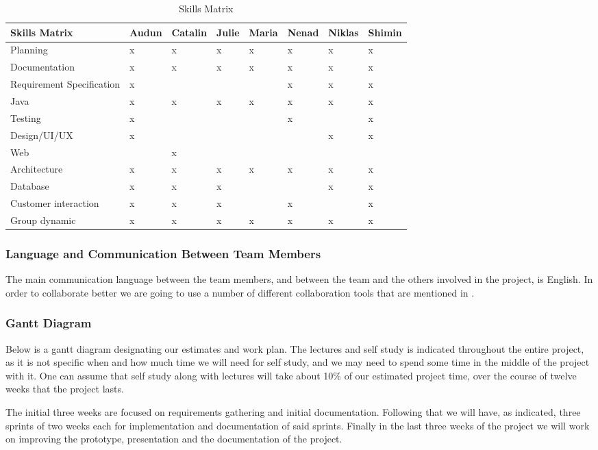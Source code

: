 \documentclass[../document.tex]{subfiles}
\begin{document}
\begin{table}[H]
\caption{Skills Matrix}
\begin{tabularx}{\textwidth}{|L{2.2cm}|X|X|L{.7cm}|X|X|X|X|}
\hline
Skills Matrix
&Audun
&Catalin
&Julie
&Maria
&Nenad
&Niklas
&Shimin
\\ \hline Planning
&x
&x
&x
&x
&x
&x
&x
\\ \hline Documentation
&x
&x
&x
&x
&x
&x
&x
\\ \hline Requirement Specification
&x
&
&
&
&x
&x
&x
\\ \hline Java
&x
&x
&x
&x
&x
&x
&x
\\ \hline Testing
&x
&
&
&
&x
&
&x
\\ \hline Design/UI/UX
&x
&
&
&
&
&x
&x
\\ \hline Web
&
&x
&
&
&
&
&
\\ \hline Architecture
&x
&x
&x
&x
&x
&x
&x
\\ \hline Database
&x
&x
&x
&
&
&x
&x
\\ \hline Customer interaction
&x
&x
&x
&
&x
&
&x
\\ \hline Group dynamic
&x
&x
&x
&x
&x
&x
&x
\\ \hline
\end{tabularx}
\end{table}

\subsubsection{Language and Communication Between Team Members}
The main communication language between the team members, and between the team and the others involved in the project, is English. In order to collaborate better we are going to use a number of different collaboration tools that are mentioned in .


\subsubsection{Gantt Diagram}
Below is a gantt diagram designating our estimates and work plan. The lectures and self study is indicated throughout the entire project, as it is not specific when and how much time we will need for self study, and we may need to spend some time in the middle of the project with it. One can assume that self study along with lectures will take about 10\% of our estimated project time, over the course of twelve weeks that the project lasts.

The initial three weeks are focused on requirements gathering and initial documentation. Following that we will have, as indicated, three sprints of two weeks each for implementation and documentation of said sprints. Finally in the last three weeks of the project we will work on improving the prototype, presentation and the documentation of the project.
\end{document}
